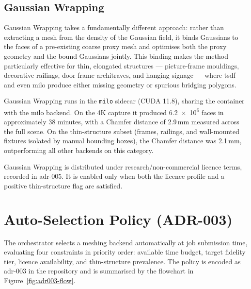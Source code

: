 \subsection{Gaussian Wrapping}
\label{sec:gw}

Gaussian Wrapping \parencite{Waczynska2024GaussianWrapping} takes a fundamentally different approach: rather than extracting a mesh from the density of the Gaussian field, it binds Gaussians to the faces of a pre-existing coarse proxy mesh and optimises both the proxy geometry and the bound Gaussians jointly. This binding makes the method particularly effective for thin, elongated structures --- picture-frame mouldings, decorative railings, door-frame architraves, and hanging signage --- where \acrshort{tsdf} and even \acrshort{milo} produce either missing geometry or spurious bridging polygons.

Gaussian Wrapping runs in the \texttt{milo} sidecar (CUDA 11.8), sharing the container with the \acrshort{milo} backend. On the 4K capture it produced \num{6.2e6} faces in approximately 38 minutes, with a Chamfer distance of \num{2.9}\,mm measured across the full scene. On the thin-structure subset (frames, railings, and wall-mounted fixtures isolated by manual bounding boxes), the Chamfer distance was \num{2.1}\,mm, outperforming all other backends on this category.

Gaussian Wrapping is distributed under research/non-commercial licence terms, recorded in \acrshort{adr}-005. It is enabled only when both the licence profile and a positive thin-structure flag are satisfied.

\section{Auto-Selection Policy (ADR-003)}
\label{sec:adr003}

The orchestrator selects a meshing backend automatically at job submission time, evaluating four constraints in priority order: available time budget, target fidelity tier, licence availability, and thin-structure prevalence. The policy is encoded as \acrshort{adr}-003 in the repository and is summarised by the flowchart in Figure~\ref{fig:adr003-flow}.

